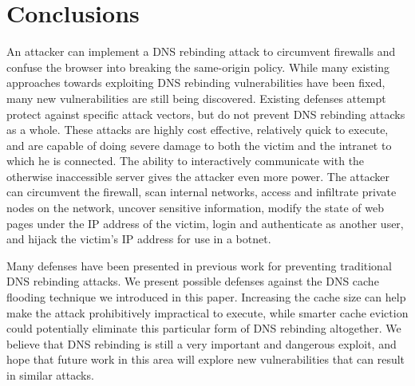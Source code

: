 \section{Conclusions}
\label{sec:conc}

An attacker can implement a DNS rebinding attack to circumvent firewalls and confuse the browser into breaking the same-origin policy. While many existing approaches towards exploiting DNS rebinding vulnerabilities have been fixed, many new vulnerabilities are still being discovered. Existing defenses attempt protect against specific attack vectors, but do not prevent DNS rebinding attacks as a whole. These attacks are highly cost effective, relatively quick to execute, and are capable of doing severe damage to both the victim and the intranet to which he is connected. The ability to interactively communicate with the otherwise inaccessible server gives the attacker even more power. The attacker can circumvent the firewall, scan internal networks, access and infiltrate private nodes on the network, uncover sensitive information, modify the state of web pages under the IP address of the victim, login and authenticate as another user, and hijack the victim's IP address for use in a botnet.

Many defenses have been presented in previous work for preventing traditional DNS rebinding attacks. We present possible defenses against the DNS cache flooding technique we introduced in this paper. Increasing the cache size can help make the attack prohibitively impractical to execute, while smarter cache eviction could potentially eliminate this particular form of DNS rebinding altogether. We believe that DNS rebinding is still a very important and dangerous exploit, and hope that future work in this area will explore new vulnerabilities that can result in similar attacks.

